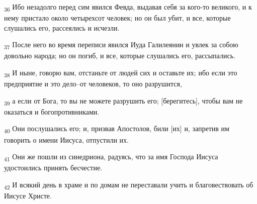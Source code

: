 \begin{tcolorbox}
\textsubscript{36} Ибо незадолго перед сим явился Февда, выдавая себя за кого-то великого, и к нему пристало около четырехсот человек; но он был убит, и все, которые слушались его, рассеялись и исчезли.
\end{tcolorbox}
\begin{tcolorbox}
\textsubscript{37} После него во время переписи явился Иуда Галилеянин и увлек за собою довольно народа; но он погиб, и все, которые слушались его, рассыпались.
\end{tcolorbox}
\begin{tcolorbox}
\textsubscript{38} И ныне, говорю вам, отстаньте от людей сих и оставьте их; ибо если это предприятие и это дело--от человеков, то оно разрушится,
\end{tcolorbox}
\begin{tcolorbox}
\textsubscript{39} а если от Бога, то вы не можете разрушить его; [берегитесь], чтобы вам не оказаться и богопротивниками.
\end{tcolorbox}
\begin{tcolorbox}
\textsubscript{40} Они послушались его; и, призвав Апостолов, били [их] и, запретив им говорить о имени Иисуса, отпустили их.
\end{tcolorbox}
\begin{tcolorbox}
\textsubscript{41} Они же пошли из синедриона, радуясь, что за имя Господа Иисуса удостоились принять бесчестие.
\end{tcolorbox}
\begin{tcolorbox}
\textsubscript{42} И всякий день в храме и по домам не переставали учить и благовествовать об Иисусе Христе.
\end{tcolorbox}
